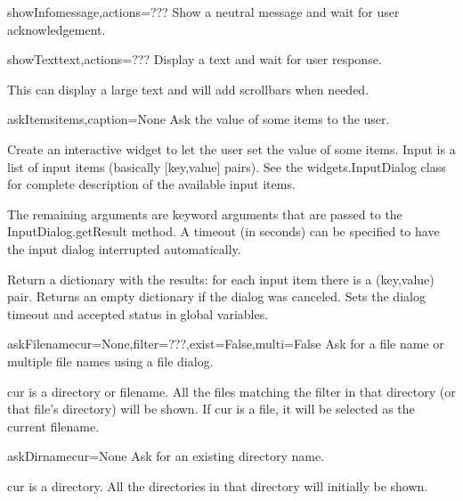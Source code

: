 \begin{funcdesc}{showInfo}{message,actions=???}
Show a neutral message and wait for user acknowledgement.

\end{funcdesc}


\begin{funcdesc}{showText}{text,actions=???}
Display a text and wait for user response.

    This can display a large text and will add scrollbars when needed.
    

\end{funcdesc}


\begin{funcdesc}{askItems}{items,caption=None}
Ask the value of some items to the user.

    Create an interactive widget to let the user set the value of some items.
    Input is a list of input items (basically [key,value] pairs).
    See the widgets.InputDialog class for complete description of the
    available input items.

    The remaining arguments are keyword arguments that are passed to the
    InputDialog.getResult method.
    A timeout (in seconds) can be specified to have the input dialog
    interrupted automatically.

    Return a dictionary with the results: for each input item there is a
    (key,value) pair. Returns an empty dictionary if the dialog was canceled.
    Sets the dialog timeout and accepted status in global variables.
    

\end{funcdesc}


\begin{funcdesc}{askFilename}{cur=None,filter=???,exist=False,multi=False}
Ask for a file name or multiple file names using a file dialog.

    cur is a directory or filename. All the files matching the filter in that
    directory (or that file's directory) will be shown.
    If cur is a file, it will be selected as the current filename.
    

\end{funcdesc}


\begin{funcdesc}{askDirname}{cur=None}
Ask for an existing directory name.

    cur is a directory. All the directories in that directory will
    initially be shown.
    

\end{funcdesc}


